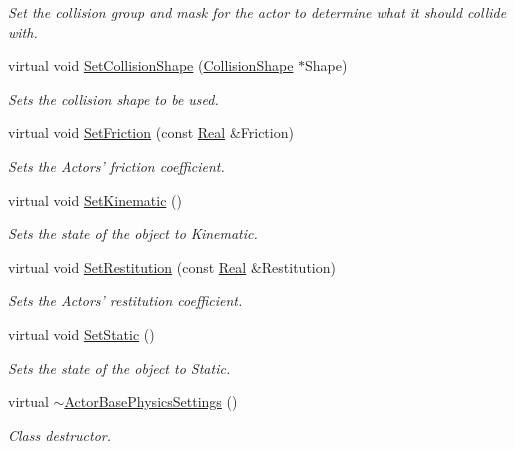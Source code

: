 \begin{DoxyCompactItemize}
\begin{DoxyCompactList}\small\item\em Set the collision group and mask for the actor to determine what it should collide with. \item\end{DoxyCompactList}\item 
virtual void \hyperlink{classphys_1_1ActorBasePhysicsSettings_a1509c654724bcb6499ec1e5058ab5185}{SetCollisionShape} (\hyperlink{classphys_1_1CollisionShape}{CollisionShape} $\ast$Shape)
\begin{DoxyCompactList}\small\item\em Sets the collision shape to be used. \item\end{DoxyCompactList}\item 
virtual void \hyperlink{classphys_1_1ActorBasePhysicsSettings_ad76ddc51fb8514c1cffa9d5f222b580c}{SetFriction} (const \hyperlink{namespacephys_af7eb897198d265b8e868f45240230d5f}{Real} \&Friction)
\begin{DoxyCompactList}\small\item\em Sets the Actors' friction coefficient. \item\end{DoxyCompactList}\item 
virtual void \hyperlink{classphys_1_1ActorBasePhysicsSettings_a3e2a58dbbe32fd193f80821e8dd6e7f5}{SetKinematic} ()
\begin{DoxyCompactList}\small\item\em Sets the state of the object to Kinematic. \item\end{DoxyCompactList}\item 
virtual void \hyperlink{classphys_1_1ActorBasePhysicsSettings_ab379008b313aeeecfe82f641ce8b6305}{SetRestitution} (const \hyperlink{namespacephys_af7eb897198d265b8e868f45240230d5f}{Real} \&Restitution)
\begin{DoxyCompactList}\small\item\em Sets the Actors' restitution coefficient. \item\end{DoxyCompactList}\item 
virtual void \hyperlink{classphys_1_1ActorBasePhysicsSettings_a20addfbc6cdfdc7d6f7847a8695f1172}{SetStatic} ()
\begin{DoxyCompactList}\small\item\em Sets the state of the object to Static. \item\end{DoxyCompactList}\item 
\hypertarget{classphys_1_1ActorBasePhysicsSettings_a6e10308c8888c67a196982bc6cbdebbf}{
virtual \hyperlink{classphys_1_1ActorBasePhysicsSettings_a6e10308c8888c67a196982bc6cbdebbf}{$\sim$ActorBasePhysicsSettings} ()}
\label{classphys_1_1ActorBasePhysicsSettings_a6e10308c8888c67a196982bc6cbdebbf}

\begin{DoxyCompactList}\small\item\em Class destructor. \item\end{DoxyCompactList}\end{DoxyCompactItemize}
